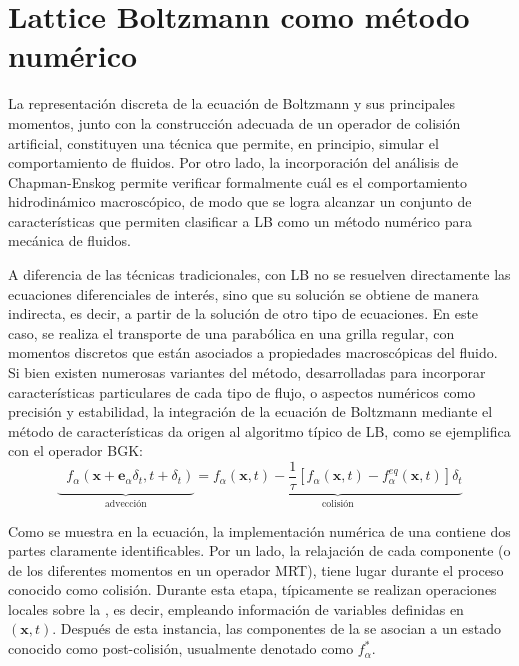 \section{Lattice Boltzmann como m\'etodo num\'erico}

La representaci\'on discreta de la ecuaci\'on de Boltzmann y sus principales momentos, junto con la construcci\'on adecuada de un operador de colisi\'on artificial, constituyen una t\'ecnica que permite, en principio, simular el comportamiento de fluidos. Por otro lado, la incorporaci\'on del an\'alisis de Chapman-Enskog permite verificar formalmente cu\'al es el comportamiento hidrodin\'amico macrosc\'opico, de modo que se logra alcanzar un conjunto de caracter\'isticas que permiten clasificar a LB como un m\'etodo num\'erico para mec\'anica de fluidos.

A diferencia de las t\'ecnicas tradicionales, con LB no se resuelven directamente las ecuaciones diferenciales de inter\'es, sino que su soluci\'on se obtiene de manera indirecta, es decir, a partir de la soluci\'on de otro tipo de ecuaciones. En este caso, se realiza el transporte de una \fdp{} parab\'olica en una grilla regular, con momentos discretos que est\'an asociados a propiedades macrosc\'opicas del fluido. Si bien existen numerosas variantes del m\'etodo, desarrolladas para incorporar caracter\'isticas particulares de cada tipo de flujo, o aspectos num\'ericos como precisi\'on y estabilidad, la integraci\'on de la ecuaci\'on de Boltzmann mediante el m\'etodo de caracter\'isticas da origen al algoritmo t\'ipico de LB, como se ejemplifica con el operador BGK:
\begin{equation}
	\underbrace{ \phantom{\dfrac{1}{\tau}} f_{\alpha}(\bm{x}+\bm{e}_{\alpha}\delta_t, t+\delta_t)}_{\mbox{advecci\'on}} = 
	\underbrace{ f_{\alpha}(\bm{x},t) -\dfrac{1}{\tau} \left[ f_{\alpha}(\bm{x},t) - f_{\alpha}^{eq}(\bm{x},t) \right]\delta_t}_{\mbox{colisi\'on}}
\end{equation}

Como se muestra en la ecuaci\'on, la implementaci\'on num\'erica de una \lbe{} contiene dos partes claramente identificables. Por un lado, la relajaci\'on de cada componente (o de los diferentes momentos en un operador MRT), tiene lugar durante el proceso conocido como colisi\'on. Durante esta etapa, t\'ipicamente se realizan operaciones locales sobre la \fdp{}, es decir, empleando informaci\'on de variables definidas en $(\bm{x},t)$. Despu\'es de esta instancia, las componentes de la \fdp{} se asocian a un estado conocido como post-colisi\'on, usualmente denotado como $f_{\alpha}^*$. 

